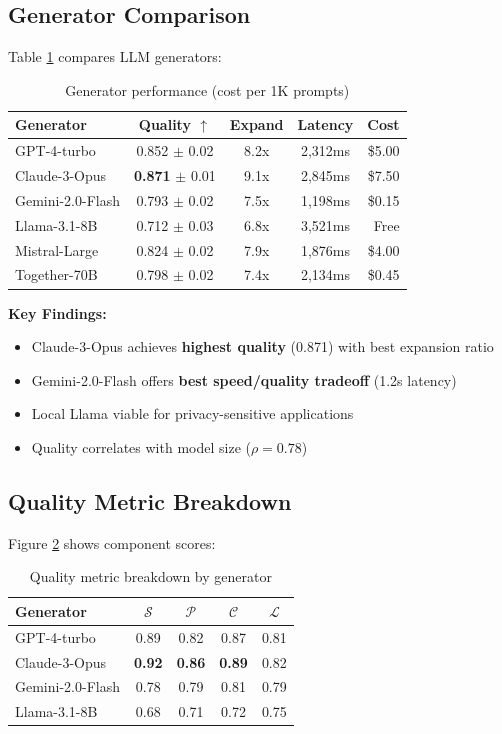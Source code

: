 \documentclass[11pt,a4paper]{article}
\begin{document}
\subsection{Generator Comparison}

Table \ref{tab:generator_results} compares LLM generators:

\begin{table}[h]
\centering
\small
\begin{tabular}{lcccr}
\toprule
\textbf{Generator} & \textbf{Quality} $\uparrow$ & \textbf{Expand} & \textbf{Latency} & \textbf{Cost} \\
\midrule
GPT-4-turbo & 0.852 $\pm$ 0.02 & 8.2x & 2,312ms & \$5.00 \\
Claude-3-Opus & \textbf{0.871} $\pm$ 0.01 & 9.1x & 2,845ms & \$7.50 \\
Gemini-2.0-Flash & 0.793 $\pm$ 0.02 & 7.5x & 1,198ms & \$0.15 \\
Llama-3.1-8B & 0.712 $\pm$ 0.03 & 6.8x & 3,521ms & Free \\
Mistral-Large & 0.824 $\pm$ 0.02 & 7.9x & 1,876ms & \$4.00 \\
Together-70B & 0.798 $\pm$ 0.02 & 7.4x & 2,134ms & \$0.45 \\
\bottomrule
\end{tabular}
\caption{Generator performance (cost per 1K prompts)}
\label{tab:generator_results}
\end{table}

\textbf{Key Findings:}
\begin{itemize}
    \item Claude-3-Opus achieves \textbf{highest quality} (0.871) with best expansion ratio
    \item Gemini-2.0-Flash offers \textbf{best speed/quality tradeoff} (1.2s latency)
    \item Local Llama viable for privacy-sensitive applications
    \item Quality correlates with model size ($\rho = 0.78$)
\end{itemize}

\subsection{Quality Metric Breakdown}

Figure \ref{fig:quality_breakdown} shows component scores:

\begin{table}[h]
\centering
\small
\begin{tabular}{lcccc}
\toprule
\textbf{Generator} & $\mathcal{S}$ & $\mathcal{P}$ & $\mathcal{C}$ & $\mathcal{L}$ \\
\midrule
GPT-4-turbo & 0.89 & 0.82 & 0.87 & 0.81 \\
Claude-3-Opus & \textbf{0.92} & \textbf{0.86} & \textbf{0.89} & 0.82 \\
Gemini-2.0-Flash & 0.78 & 0.79 & 0.81 & 0.79 \\
Llama-3.1-8B & 0.68 & 0.71 & 0.72 & 0.75 \\
\bottomrule
\end{tabular}
\caption{Quality metric breakdown by generator}
\label{fig:quality_breakdown}
\end{table}
\end{document}
